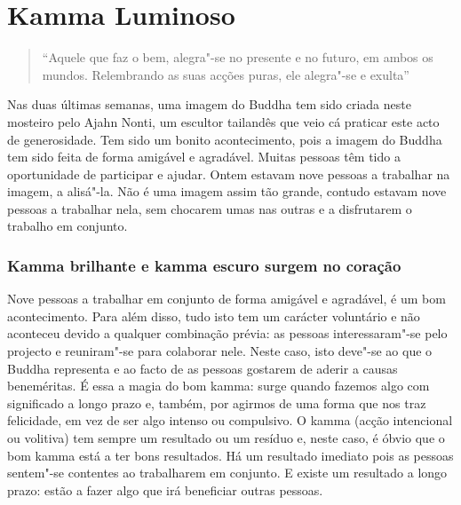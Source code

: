 
\chapter{Kamma Luminoso}


\begin{quote}
  ``Aquele que faz o bem, alegra"-se no presente e no futuro, em ambos os mundos. Relembrando as suas acções puras, ele alegra"-se e exulta''

\end{quote}

Nas duas últimas semanas, uma imagem do Buddha tem sido criada neste mosteiro
pelo Ajahn Nonti, um escultor tailandês que veio cá praticar este acto de
generosidade. Tem sido um bonito acontecimento, pois a imagem do Buddha tem sido
feita de forma amigável e agradável. Muitas pessoas têm tido a oportunidade de
participar e ajudar. Ontem estavam nove pessoas a trabalhar na imagem, a
alisá"-la. Não é uma imagem assim tão grande, contudo estavam nove pessoas a
trabalhar nela, sem chocarem umas nas outras e a disfrutarem o trabalho em
conjunto.

\subsection{Kamma brilhante e kamma escuro surgem no coração}

Nove pessoas a trabalhar em conjunto de forma amigável e agradável, é um bom
acontecimento. Para além disso, tudo isto tem um carácter voluntário e não
aconteceu devido a qualquer combinação prévia: as pessoas interessaram"-se pelo
projecto e reuniram"-se para colaborar nele. Neste caso, isto deve"-se ao que o
Buddha representa e ao facto de as pessoas gostarem de aderir a causas
beneméritas. É essa a magia do bom kamma: surge quando fazemos algo com
significado a longo prazo e, também, por agirmos de uma forma que nos traz
felicidade, em vez de ser algo intenso ou compulsivo. O kamma (acção intencional
ou volitiva) tem sempre um resultado ou um resíduo e, neste caso, é óbvio que o
bom kamma está a ter bons resultados. Há um resultado imediato pois as pessoas
sentem"-se contentes ao trabalharem em conjunto. E existe um resultado a longo
prazo: estão a fazer algo que irá beneficiar outras pessoas.

